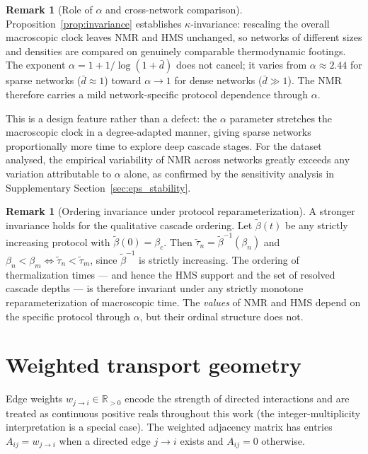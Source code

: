 \documentclass[aps,superscriptaddress,11pt]{revtex4-2}
\theoremstyle{definition}
\newtheorem{remark}[theorem]{Remark}
\theoremstyle{plain}
\begin{document}
\begin{remark}[Role of $\alpha$ and cross-network comparison]
\label{rem:alpha}
Proposition~\ref{prop:invariance} establishes $\kappa$-invariance:
rescaling the overall macroscopic clock leaves NMR and HMS unchanged, so
networks of different sizes and densities are compared on genuinely
comparable thermodynamic footings. The exponent
$\alpha = 1 + 1/\log(1+\bar{d})$ does not cancel; it varies from
$\alpha\approx2.44$ for sparse networks ($\bar{d}\approx 1$) toward
$\alpha\to 1$ for dense networks ($\bar{d}\gg1$). The NMR therefore
carries a mild network-specific protocol dependence through $\alpha$.

This is a design feature rather than a defect: the $\alpha$ parameter
stretches the macroscopic clock in a degree-adapted manner, giving sparse
networks proportionally more time to explore deep cascade stages. For the
dataset analysed, the empirical variability of NMR across networks greatly
exceeds any variation attributable to $\alpha$ alone, as confirmed by the
sensitivity analysis in Supplementary Section~\ref{sec:eps_stability}.
\end{remark}

\begin{remark}[Ordering invariance under protocol reparameterization]
\label{rem:order_inv}
A stronger invariance holds for the qualitative cascade ordering. Let
$\tilde\beta(t)$ be any strictly increasing protocol with
$\tilde\beta(0)=\beta_c$. Then $\tilde\tau_n=\tilde\beta^{-1}(\beta_n)$
and $\beta_n<\beta_m \Leftrightarrow \tilde\tau_n<\tilde\tau_m$, since
$\tilde\beta^{-1}$ is strictly increasing. The ordering of thermalization
times — and hence the HMS support and the set of resolved cascade depths —
is therefore invariant under any strictly monotone reparameterization of
macroscopic time. The \emph{values} of NMR and HMS depend on the specific
protocol through $\alpha$, but their ordinal structure does not.
\end{remark}

\section{Weighted transport geometry}
\label{sec:geometry}

Edge weights $w_{j\to i}\in\mathbb{R}_{>0}$ encode the strength of
directed interactions and are treated as continuous positive reals
throughout this work (the integer-multiplicity interpretation is a
special case).  The weighted adjacency matrix has entries
$A_{ij}=w_{j\to i}$ when a directed edge $j\to i$ exists and $A_{ij}=0$
otherwise.
\end{document}
